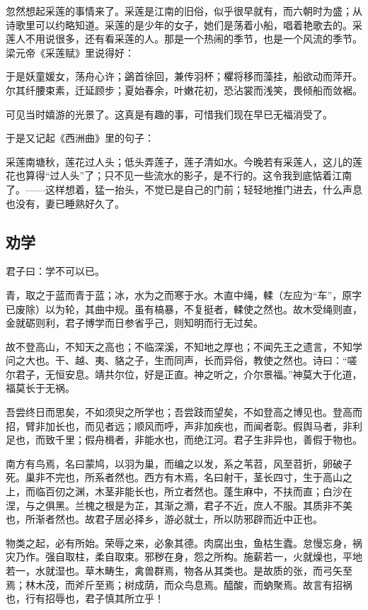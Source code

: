 忽然想起采莲的事情来了。采莲是江南的旧俗，似乎很早就有，而六朝时为盛；从诗歌里可以约略知道。采莲的是少年的女子，她们是荡着小船，唱着艳歌去的。采莲人不用说很多，还有看采莲的人。那是一个热闹的季节，也是一个风流的季节。梁元帝《采莲赋》里说得好：

于是妖童媛女，荡舟心许；鷁首徐回，兼传羽杯；欋将移而藻挂，船欲动而萍开。尔其纤腰束素，迁延顾步；夏始春余，叶嫩花初，恐沾裳而浅笑，畏倾船而敛裾。

可见当时嬉游的光景了。这真是有趣的事，可惜我们现在早已无福消受了。

于是又记起《西洲曲》里的句子：

采莲南塘秋，莲花过人头；低头弄莲子，莲子清如水。今晚若有采莲人，这儿的莲花也算得“过人头”了；只不见一些流水的影子，是不行的。这令我到底惦着江南了。——这样想着，猛一抬头，不觉已是自己的门前；轻轻地推门进去，什么声息也没有，妻已睡熟好久了。

\subsection{劝学}
君子曰：学不可以已。

青，取之于蓝而青于蓝；冰，水为之而寒于水。木直中绳，輮（左应为“车”，原字已废除）以为轮，其曲中规。虽有槁暴，不复挺者，輮使之然也。故木受绳则直，金就砺则利，君子博学而日参省乎己，则知明而行无过矣。

故不登高山，不知天之高也；不临深溪，不知地之厚也；不闻先王之遗言，不知学问之大也。干、越、夷、貉之子，生而同声，长而异俗，教使之然也。诗曰：“嗟尔君子，无恒安息。靖共尔位，好是正直。神之听之，介尔景福。”神莫大于化道，福莫长于无祸。

吾尝终日而思矣，不如须臾之所学也；吾尝跂而望矣，不如登高之博见也。登高而招，臂非加长也，而见者远；顺风而呼，声非加疾也，而闻者彰。假舆马者，非利足也，而致千里；假舟楫者，非能水也，而绝江河。君子生非异也，善假于物也。

南方有鸟焉，名曰蒙鸠，以羽为巢，而编之以发，系之苇苕，风至苕折，卵破子死。巢非不完也，所系者然也。西方有木焉，名曰射干，茎长四寸，生于高山之上，而临百仞之渊，木茎非能长也，所立者然也。蓬生麻中，不扶而直；白沙在涅，与之俱黑。兰槐之根是为芷，其渐之滫，君子不近，庶人不服。其质非不美也，所渐者然也。故君子居必择乡，游必就士，所以防邪辟而近中正也。

物类之起，必有所始。荣辱之来，必象其德。肉腐出虫，鱼枯生蠹。怠慢忘身，祸灾乃作。强自取柱，柔自取束。邪秽在身，怨之所构。施薪若一，火就燥也，平地若一，水就湿也。草木畴生，禽兽群焉，物各从其类也。是故质的张，而弓矢至焉；林木茂，而斧斤至焉；树成荫，而众鸟息焉。醯酸，而蚋聚焉。故言有招祸也，行有招辱也，君子慎其所立乎！

